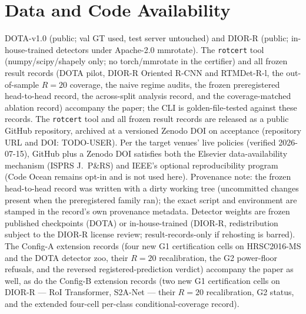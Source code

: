 \documentclass[journal]{IEEEtran}
\begin{document}
\section*{Data and Code Availability}
DOTA-v1.0 (public; val GT used, test server untouched) and DIOR-R (public; in-house-trained detectors under
Apache-2.0 mmrotate). The \texttt{rotcert} tool (numpy/scipy/shapely only; no torch/mmrotate in the certifier)
and all frozen result records (DOTA pilot, DIOR-R Oriented R-CNN and RTMDet-R-l, the out-of-sample $R{=}20$
coverage, the naive regime audits, the frozen preregistered head-to-head record, the across-split analysis
record, and the coverage-matched ablation record) accompany the paper; the CLI is golden-file-tested against
these records. The \texttt{rotcert} tool and all frozen result records are released as a public GitHub
repository, archived at a versioned Zenodo DOI on acceptance (repository URL and DOI: TODO-USER).
Per the target venues' live policies (verified 2026-07-15), GitHub plus a Zenodo DOI satisfies both the
Elsevier data-availability mechanism (ISPRS J.\ P\&RS) and IEEE's optional reproducibility program
(Code Ocean remains opt-in and is not used here). Provenance note: the
frozen head-to-head record was written with a dirty working tree (uncommitted changes present when the
preregistered family ran); the exact script and environment are stamped in the record's own provenance
metadata. Detector weights are frozen published checkpoints (DOTA) or in-house-trained (DIOR-R, redistribution
subject to the DIOR-R license review; result-records-only if rehosting is barred). The Config-A extension
records (four new G1 certification cells on HRSC2016-MS and the DOTA detector zoo, their $R{=}20$
recalibration, the G2 power-floor refusals, and the reversed registered-prediction verdict) accompany the
paper as well, as do the Config-B extension records (two new G1 certification cells on DIOR-R --- RoI
Transformer, S2A-Net --- their $R{=}20$ recalibration, G2 status, and the extended four-cell per-class
conditional-coverage record).



\end{document}
